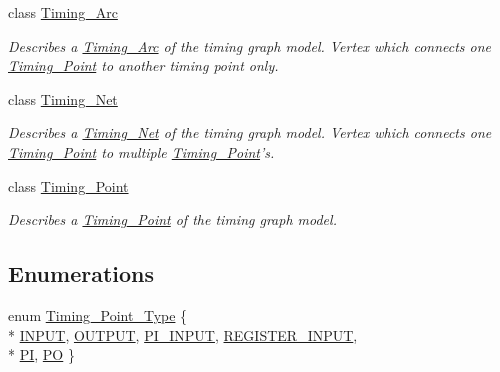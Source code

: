 \begin{DoxyCompactItemize}
class \hyperlink{classTiming__Analysis_1_1Timing__Arc}{Timing\-\_\-\-Arc}
\begin{DoxyCompactList}\small\item\em Describes a \hyperlink{classTiming__Analysis_1_1Timing__Arc}{Timing\-\_\-\-Arc} of the timing graph model. Vertex which connects one \hyperlink{classTiming__Analysis_1_1Timing__Point}{Timing\-\_\-\-Point} to another timing point only. \end{DoxyCompactList}\item 
class \hyperlink{classTiming__Analysis_1_1Timing__Net}{Timing\-\_\-\-Net}
\begin{DoxyCompactList}\small\item\em Describes a \hyperlink{classTiming__Analysis_1_1Timing__Net}{Timing\-\_\-\-Net} of the timing graph model. Vertex which connects one \hyperlink{classTiming__Analysis_1_1Timing__Point}{Timing\-\_\-\-Point} to multiple \hyperlink{classTiming__Analysis_1_1Timing__Point}{Timing\-\_\-\-Point}'s. \end{DoxyCompactList}\item 
class \hyperlink{classTiming__Analysis_1_1Timing__Point}{Timing\-\_\-\-Point}
\begin{DoxyCompactList}\small\item\em Describes a \hyperlink{classTiming__Analysis_1_1Timing__Point}{Timing\-\_\-\-Point} of the timing graph model. \end{DoxyCompactList}\end{DoxyCompactItemize}
\subsection*{Enumerations}
\begin{DoxyCompactItemize}
\item 
enum \hyperlink{namespaceTiming__Analysis_a16a3b48fc06525858e635c3cde4d0ff9}{Timing\-\_\-\-Point\-\_\-\-Type} \{ \\*
\hyperlink{namespaceTiming__Analysis_a16a3b48fc06525858e635c3cde4d0ff9a0ca512a1b74ecb8439f173c72e8afa6d}{I\-N\-P\-U\-T}, 
\hyperlink{namespaceTiming__Analysis_a16a3b48fc06525858e635c3cde4d0ff9a38c3a90c2d97aa2e55b29c80e4bc1d61}{O\-U\-T\-P\-U\-T}, 
\hyperlink{namespaceTiming__Analysis_a16a3b48fc06525858e635c3cde4d0ff9adf9c2b863143a2c93ad08c3864e048e4}{P\-I\-\_\-\-I\-N\-P\-U\-T}, 
\hyperlink{namespaceTiming__Analysis_a16a3b48fc06525858e635c3cde4d0ff9af01b23238ffbb86ab43db28f1ca8498d}{R\-E\-G\-I\-S\-T\-E\-R\-\_\-\-I\-N\-P\-U\-T}, 
\\*
\hyperlink{namespaceTiming__Analysis_a16a3b48fc06525858e635c3cde4d0ff9a50133e36e33b25c7bc2a0bbbb200344c}{P\-I}, 
\hyperlink{namespaceTiming__Analysis_a16a3b48fc06525858e635c3cde4d0ff9ad883063ea5a1641c13b25eb6bca73826}{P\-O}
 \}
\end{DoxyCompactItemize}


